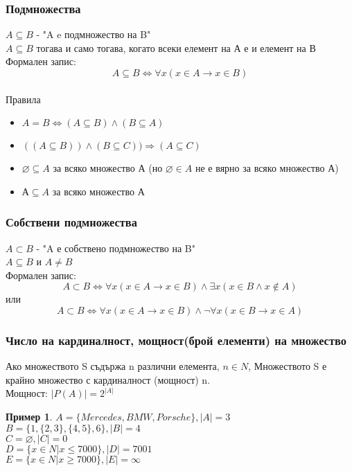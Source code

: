 \documentclass[fleqn, 12pt]{article}
\newtheorem{example}{Пример}[subsection]
\begin{document}
\subsubsection{Подмножества}
$A \subseteq B$ - "A e подмножество на B"\\
$A \subseteq B$ тогава и само тогава, когато всеки елемент на А е и елемент на В\\
Формален запис:
$$A \subseteq B \Leftrightarrow \forall x (x \in A \rightarrow x \in B )$$
\\
Правила
\begin{itemize}
	\item $A = B \Leftrightarrow (A \subseteq B) \land (B \subseteq A)$
	\item $((A \subseteq B)) \land (B \subseteq C)) \Rightarrow (A \subseteq C) $
	\item $\varnothing \subseteq A$ за всяко множество А (но $\varnothing \in A$ не е вярно за всяко множество А)
	\item $А \subseteq A$ за всяко множество А
\end{itemize}

\subsubsection{Собствени подмножества}
$A \subset B$ - "A е собствено подмножество на B"\\
$A \subseteq B$ и $A \neq B$\\
Формален запис:
$$A \subset B \Leftrightarrow \forall x (x \in A \rightarrow x \in B ) \land \exists x (x \in B \land x \notin A)$$
или
$$A \subset B \Leftrightarrow \forall x (x \in A \rightarrow x \in B ) \land \neg \forall x (x \in B \rightarrow x \in A)$$

\subsubsection{Число на кардиналност, мощност(брой елементи)  на множество}
Ако множеството S съдържа n различни елемента, $n \in N$, Множеството S е крайно множество с кардиналност (мощност) n.\\
Мощност: $|P(A)| = 2^{|A|}$ 
\begin{example}
$A = \{Mercedes, BMW, Porsche\}, |A| = 3 $\\
$B = \{1, \{2, 3\}, \{4, 5\}, 6\}, |B| = 4 $\\
$C = \varnothing, |C| = 0 $ \\
$D = \{x \in N | x \leq 7000\}, |D| = 7001$\\
$E = \{x \in N | x \geq 7000\}, |E| = \infty$\\
\end{example}
\end{document}
